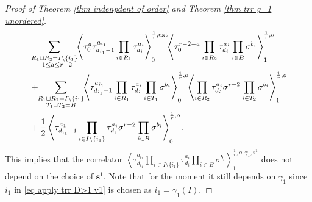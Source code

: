 \documentclass[11pt]{amsart}
\theoremstyle{definition}
\theoremstyle{remark}
\newcommand{\consta}{{\frac{1}{2}}}
\newcommand{\<}{\left<}
\renewcommand{\>}{\right>}
\numberwithin{equation}{section}
\begin{document}
\begin{proof}[Proof of Theorem \ref{thm indenpdent of order} and Theorem \ref{thm trr g=1 unordered}]
\begin{equation}
\begin{split}
    &\sum_{\substack{R_1 \sqcup R_2 = I\setminus\{i_1\}\\ -1\le a \le r-2}}\hspace{-0.1cm}\left\langle \tau_0^{a}\tau_{d_{i_1}-1}^{a_{i_1}}\prod_{i \in R_1}\tau_{d_i}^{a_i}\right\rangle^{\frac{1}{r},\text{ext}}_0
    \hspace{-0.1cm}\left\langle \tau_0^{r-2-a}\prod_{i\in R_2}\tau^{a_i}_{d_i}\prod_{i\in B}\sigma^{b_i}\right\rangle^{\frac{1}{r},o}_1\\
    &+\hspace{-0.1cm}\sum_{\substack{R_1 \sqcup R_2 =  I\setminus\{i_1\} \\ T_1 \sqcup T_2 =  B}} \hspace{-0.1cm} \left\langle \tau^{a_{i_1}}_{d_{i_1}-1}\prod_{i \in R_1} \tau^{a_i}_{d_i}\prod_{i\in T_1}\sigma^{b_i}\right\rangle^{\frac{1}{r},o}_0 \hspace{-0.1cm}\left\langle \prod_{i \in R_2} \tau^{a_i}_{d_i} \sigma^{r-2}\prod_{i\in T_2}\sigma^{b_i}\right\rangle^{\frac{1}{r}, o}_1\\
    &+\consta\left\langle \tau_{d_{i_1}-1}^{a_1}\prod_{i\in I\setminus\{i_1\}}\tau^{a_i}_{d_i}\sigma^{r-2}\prod_{i\in B}\sigma^{b_i}\right\rangle^{\frac{1}{r},o}_0.
    \end{split}
    \end{equation} 
    This implies that the correlator 
    $\left\langle \tau_{d_{i_1}}^{a_{i_1}}\prod_{i\in I\setminus \{i_1\}}\tau^{a_i}_{d_i}\prod_{i\in B}\sigma^{b_i}\right\rangle^{\frac{1}{r},o,\gamma_1,\bm{s}^1}_1$ does not depend on the choice of $\bm{s}^1$. Note that for the moment it still depends on $\gamma_1$ since $i_1$ in \eqref{eq apply trr D>1 v1} is chosen as $i_1=\gamma_1(I)$.


\end{proof}
\end{document}
